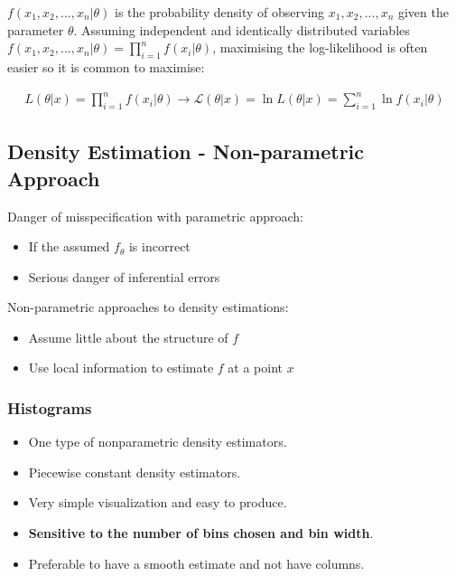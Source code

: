\indent

$f(x_1,x_2,...,x_n|\theta)$ is the probability density of observing $x_1,x_2,...,x_n$ given the parameter $\theta$. Assuming independent and identically distributed variables $f(x_1,x_2,...,x_n|\theta)=\prod_{i=1}^{n}f(x_i|\theta)$, maximising the log-likelihood is often easier so it is common to maximise:

\begin{align*}
    L(\theta|x)=\prod_{i=1}^{n}f(x_i|\theta)\xrightarrow{}\mathcal{L}(\theta|x) = \ln{L(\theta|x)} = \sum_{i=1}^{n}\ln{f(x_i|\theta)}
\end{align*}

\subsection{Density Estimation - Non-parametric Approach}

\indent

Danger of misspecification with parametric approach:

\begin{itemize}
    \item If the assumed $f_\theta$ is incorrect
    \item Serious danger of inferential errors
\end{itemize}

Non-parametric approaches to density estimations:

\begin{itemize}
    \item Assume little about the structure of $f$
    \item Use local information to estimate $f$ at a point $x$
\end{itemize}

\subsubsection{Histograms}

\begin{itemize}
    \item One type of nonparametric density estimators.
    \item Piecewise constant density estimators.
    \item Very simple visualization and easy to produce.
    \item \textbf{Sensitive to the number of bins chosen and bin width}.
    \item Preferable to have a smooth estimate and not have columns.
\end{itemize}

